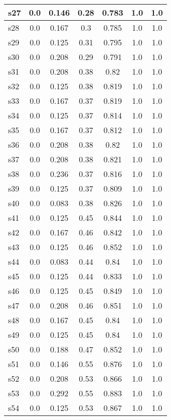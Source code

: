\documentclass{article}
\begin{document}
\begin{tabular}{|l|c|c|c|c|c|c|}
\hline
s27 &0.0 & 0.146 & 0.28 & 0.783 & 1.0 & 1.0\\
\hline
s28 &0.0 & 0.167 & 0.3 & 0.785 & 1.0 & 1.0\\
\hline
s29 &0.0 & 0.125 & 0.31 & 0.795 & 1.0 & 1.0\\
\hline
s30 &0.0 & 0.208 & 0.29 & 0.791 & 1.0 & 1.0\\
\hline
s31 &0.0 & 0.208 & 0.38 & 0.82 & 1.0 & 1.0\\
\hline
s32 &0.0 & 0.125 & 0.38 & 0.819 & 1.0 & 1.0\\
\hline
s33 &0.0 & 0.167 & 0.37 & 0.819 & 1.0 & 1.0\\
\hline
s34 &0.0 & 0.125 & 0.37 & 0.814 & 1.0 & 1.0\\
\hline
s35 &0.0 & 0.167 & 0.37 & 0.812 & 1.0 & 1.0\\
\hline
s36 &0.0 & 0.208 & 0.38 & 0.82 & 1.0 & 1.0\\
\hline
s37 &0.0 & 0.208 & 0.38 & 0.821 & 1.0 & 1.0\\
\hline
s38 &0.0 & 0.236 & 0.37 & 0.816 & 1.0 & 1.0\\
\hline
s39 &0.0 & 0.125 & 0.37 & 0.809 & 1.0 & 1.0\\
\hline
s40 &0.0 & 0.083 & 0.38 & 0.826 & 1.0 & 1.0\\
\hline
s41 &0.0 & 0.125 & 0.45 & 0.844 & 1.0 & 1.0\\
\hline
s42 &0.0 & 0.167 & 0.46 & 0.842 & 1.0 & 1.0\\
\hline
s43 &0.0 & 0.125 & 0.46 & 0.852 & 1.0 & 1.0\\
\hline
s44 &0.0 & 0.083 & 0.44 & 0.84 & 1.0 & 1.0\\
\hline
s45 &0.0 & 0.125 & 0.44 & 0.833 & 1.0 & 1.0\\
\hline
s46 &0.0 & 0.125 & 0.45 & 0.849 & 1.0 & 1.0\\
\hline
s47 &0.0 & 0.208 & 0.46 & 0.851 & 1.0 & 1.0\\
\hline
s48 &0.0 & 0.167 & 0.45 & 0.84 & 1.0 & 1.0\\
\hline
s49 &0.0 & 0.125 & 0.45 & 0.84 & 1.0 & 1.0\\
\hline
s50 &0.0 & 0.188 & 0.47 & 0.852 & 1.0 & 1.0\\
\hline
s51 &0.0 & 0.146 & 0.55 & 0.876 & 1.0 & 1.0\\
\hline
s52 &0.0 & 0.208 & 0.53 & 0.866 & 1.0 & 1.0\\
\hline
s53 &0.0 & 0.292 & 0.55 & 0.883 & 1.0 & 1.0\\
\hline
s54 &0.0 & 0.125 & 0.53 & 0.867 & 1.0 & 1.0\\
\hline

\end{tabular}
\end{document}

